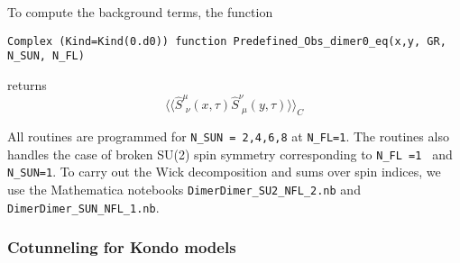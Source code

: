 To compute the background terms, the function
\begin{lstlisting}[style=fortran]
Complex (Kind=Kind(0.d0)) function Predefined_Obs_dimer0_eq(x,y, GR, N_SUN, N_FL)
\end{lstlisting}
returns 
\begin{equation}
 \langle \langle \hat{S}^{\mu}_{\, \,  \nu} (x,\tau)   \hat{S}^{\nu}_{\, \,  \mu} (y,\tau)  \rangle   \rangle_C 
\end{equation} 

All routines  are programmed  for \texttt{N\_SUN = 2,4,6,8} at \texttt{N\_FL=1}.   The routines also handles the case of broken SU(2)  spin symmetry corresponding  to  \texttt{N\_FL =1 }  and \texttt{N\_SUN=1}.   To carry out the Wick decomposition  and sums over  spin indices,  we use the  Mathematica  notebooks 
 \texttt{Dimer\-Dimer\_SU2\_NFL\_2.nb}  and \texttt{Dimer\-Dimer\_SUN\_NFL\_1.nb}.


\subsubsection{ Cotunneling   for Kondo models}

